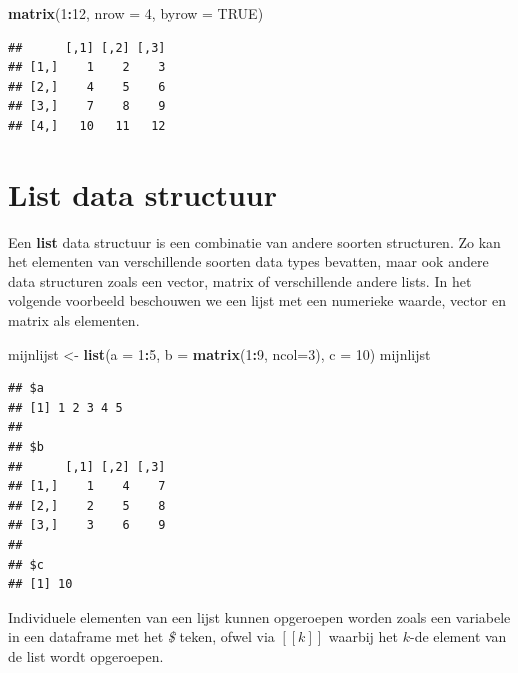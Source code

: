 \documentclass[
]{book}
\newenvironment{Shaded}{\begin{snugshade}}{\end{snugshade}}
\newcommand{\AttributeTok}[1]{\textcolor[rgb]{0.13,0.29,0.53}{#1}}
\newcommand{\ConstantTok}[1]{\textcolor[rgb]{0.56,0.35,0.01}{#1}}
\newcommand{\DecValTok}[1]{\textcolor[rgb]{0.00,0.00,0.81}{#1}}
\newcommand{\FunctionTok}[1]{\textcolor[rgb]{0.13,0.29,0.53}{\textbf{#1}}}
\newcommand{\NormalTok}[1]{#1}
\newcommand{\OtherTok}[1]{\textcolor[rgb]{0.56,0.35,0.01}{#1}}
\newcommand{\SpecialCharTok}[1]{\textcolor[rgb]{0.81,0.36,0.00}{\textbf{#1}}}
\begin{document}
\begin{Shaded}
\begin{Highlighting}[]
\FunctionTok{matrix}\NormalTok{(}\DecValTok{1}\SpecialCharTok{:}\DecValTok{12}\NormalTok{, }\AttributeTok{nrow =} \DecValTok{4}\NormalTok{, }\AttributeTok{byrow =} \ConstantTok{TRUE}\NormalTok{)}
\end{Highlighting}
\end{Shaded}

\begin{verbatim}
##      [,1] [,2] [,3]
## [1,]    1    2    3
## [2,]    4    5    6
## [3,]    7    8    9
## [4,]   10   11   12
\end{verbatim}

\hypertarget{list-data-structuur}{%
\section{List data structuur}\label{list-data-structuur}}

Een \textbf{list} data structuur is een combinatie van andere soorten structuren.
Zo kan het elementen van verschillende soorten data types bevatten, maar ook andere data structuren zoals een vector, matrix of verschillende andere lists.
In het volgende voorbeeld beschouwen we een lijst met een numerieke waarde, vector en matrix als elementen.

\begin{Shaded}
\begin{Highlighting}[]
\NormalTok{mijnlijst }\OtherTok{\textless{}{-}} \FunctionTok{list}\NormalTok{(}\AttributeTok{a =} \DecValTok{1}\SpecialCharTok{:}\DecValTok{5}\NormalTok{, }\AttributeTok{b =} \FunctionTok{matrix}\NormalTok{(}\DecValTok{1}\SpecialCharTok{:}\DecValTok{9}\NormalTok{, }\AttributeTok{ncol=}\DecValTok{3}\NormalTok{), }\AttributeTok{c =} \DecValTok{10}\NormalTok{)}
\NormalTok{mijnlijst}
\end{Highlighting}
\end{Shaded}

\begin{verbatim}
## $a
## [1] 1 2 3 4 5
## 
## $b
##      [,1] [,2] [,3]
## [1,]    1    4    7
## [2,]    2    5    8
## [3,]    3    6    9
## 
## $c
## [1] 10
\end{verbatim}

Individuele elementen van een lijst kunnen opgeroepen worden zoals een variabele in een dataframe met het \emph{\$} teken, ofwel via \([[k]]\) waarbij het \(k\)-de element van de list wordt opgeroepen.
\end{document}
